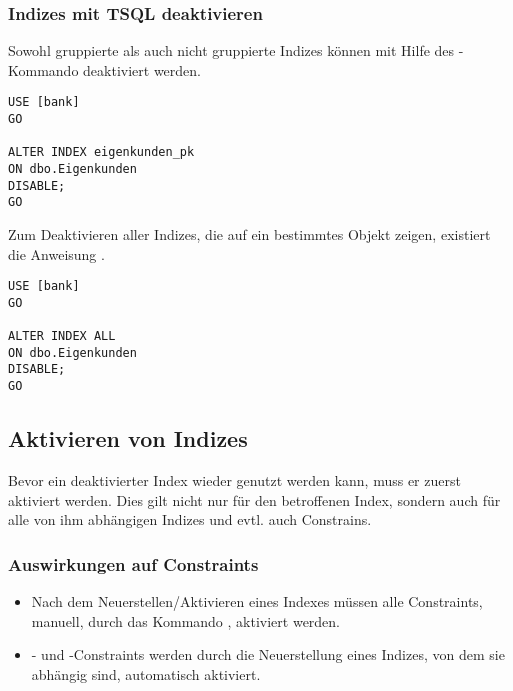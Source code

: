         \subsubsection{Indizes mit TSQL deaktivieren}
          Sowohl gruppierte als auch nicht gruppierte Indizes können mit Hilfe
          des -Kommando deaktiviert werden.
          \begin{lstlisting}[language=ms_sql, caption={Den Index
          \identifier{eigenkunden\_pk} deaktivieren}, label=admin05_15]
USE [bank]
GO

ALTER INDEX eigenkunden_pk
ON dbo.Eigenkunden
DISABLE;
GO
          \end{lstlisting}
          Zum Deaktivieren aller Indizes, die auf ein bestimmtes Objekt zeigen,
          existiert die Anweisung .
          \begin{lstlisting}[language=ms_sql, caption={Alle Indizes auf der
          Tabelle \identifier{eigenkunden}}, label=admin05_16]
USE [bank]
GO

ALTER INDEX ALL
ON dbo.Eigenkunden
DISABLE;
GO
          \end{lstlisting}
          \begin{literaturinternet}
            \item \cite{ms177456}
          \end{literaturinternet}
      \subsection{Aktivieren von Indizes}
        Bevor ein deaktivierter Index wieder genutzt werden kann, muss er zuerst
        aktiviert werden. Dies gilt nicht nur für den betroffenen Index, sondern
        auch für alle von ihm abhängigen Indizes und evtl. auch Constrains.
        \subsubsection{Auswirkungen auf Constraints}
          \begin{itemize}
            \item Nach dem Neuerstellen/Aktivieren eines Indexes müssen alle
            Constraints, manuell, durch das Kommando , aktiviert werden.
            \item \PRIMARYKEY- und \UNIQUE-Constraints werden durch die
            Neuerstellung eines Indizes, von dem sie abhängig sind, automatisch
            aktiviert.
          \end{itemize}       
